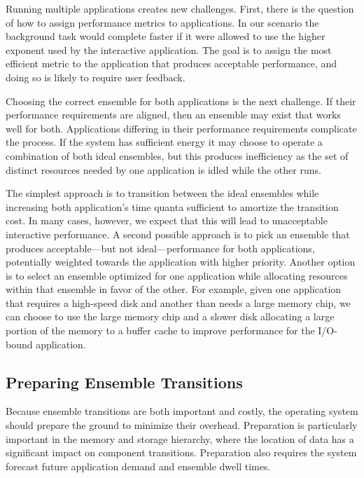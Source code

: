 Running multiple applications creates new challenges. First, there is the
question of how to assign performance metrics to applications. In our
scenario the background task would complete faster if it were allowed to use
the higher exponent used by the interactive application. The goal is to
assign the most efficient metric to the application that produces acceptable
performance, and doing so is likely to require user feedback.

Choosing the correct ensemble for both applications is the next challenge. If
their performance requirements are aligned, then an ensemble may exist that
works well for both. Applications differing in their performance requirements
complicate the process. If the system has sufficient energy it may choose to
operate a combination of both ideal ensembles, but this produces inefficiency
as the set of distinct resources needed by one application is idled while the
other runs.

The simplest approach is to transition between the ideal ensembles while
increasing both application's time quanta sufficient to amortize the
transition cost. In many cases, however, we expect that this will lead to
unacceptable interactive performance. A second possible approach is to pick
an ensemble that produces acceptable---but not ideal---performance for both
applications, potentially weighted towards the application with higher
priority. Another option is to select an ensemble optimized for one
application while allocating resources within that ensemble in favor of the
other. For example, given one application that requires a high-speed disk and
another than needs a large memory chip, we can choose to use the large memory
chip and a slower disk allocating a large portion of the memory to a buffer
cache to improve performance for the I/O-bound application.

\subsection{Preparing Ensemble Transitions}
\label{subsec-prepare}

Because ensemble transitions are both important and costly, the operating
system should prepare the ground to minimize their overhead. Preparation is
particularly important in the memory and storage hierarchy, where the
location of data has a significant impact on component transitions.
Preparation also requires the system forecast future application demand and
ensemble dwell times.

